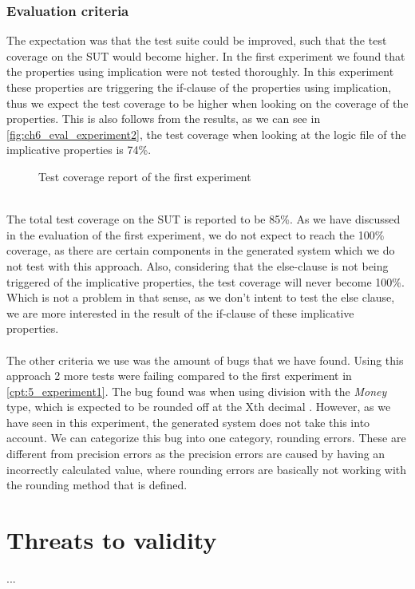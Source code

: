 \subsubsection{Evaluation criteria}
The expectation was that the test suite could be improved, such that the test coverage on the SUT would become higher. In the first experiment we found that the properties using implication were not tested thoroughly. In this experiment these properties are triggering the if-clause of the properties using implication, thus we expect the test coverage to be higher when looking on the coverage of the properties. This is also follows from the results, as we can see in \autoref{fig:ch6_eval_experiment2}, the test coverage when looking at the logic file of the implicative properties is 74\%.
\\
\begin{figure}[h!]
\caption{Test coverage report of the first experiment}
\label{fig:ch6_eval_experiment2}
\centering
\end{figure}
\\
The total test coverage on the SUT is reported to be 85\%. As we have discussed in the evaluation of the first experiment, we do not expect to reach the 100\% coverage, as there are certain components in the generated system which we do not test with this approach. Also, considering that the else-clause is not being triggered of the implicative properties, the test coverage will never become 100\%. Which is not a problem in that sense, as we don't intent to test the else clause, we are more interested in the result of the if-clause of these implicative properties.\\
\\
The other criteria we use was the amount of bugs that we have found. Using this approach 2 more tests were failing compared to the first experiment in \autoref{cpt:5_experiment1}. The bug found was when using division with the \textit{Money} type, which is expected to be rounded off at the Xth decimal . However, as we have seen in this experiment, the generated system does not take this into account. We can categorize this bug into one category, rounding errors. These are different from precision errors as the precision errors are caused by having an incorrectly calculated value, where rounding errors are basically not working with the rounding method that is defined.

\section{Threats to validity}
...
